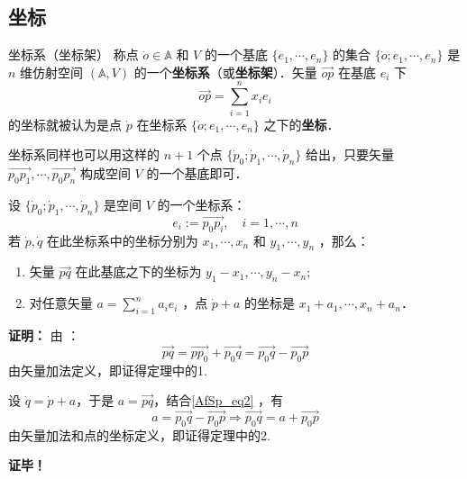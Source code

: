 \subsection{坐标}
\begin{definition}{坐标系（坐标架）}
称点 $\dot o\in\mathbb A$ 和 $V$ 的一个基底 $\{e_1,\cdots,e_n\}$ 的集合 $\{\dot o;e_1,\cdots,e_n\}$ 是 $n$ 维仿射空间 $(\mathbb A,V)$ 的一个\textbf{坐标系}（或\textbf{坐标架}）．矢量 $\overrightarrow{op}$ 在基底 ${e_i}$ 下
\begin{equation}
\overrightarrow{op}=\sum_{i=1}^n x_ie_i
\end{equation}
的坐标就被认为是点 $\dot p$ 在坐标系 $\{\dot o;e_1,\cdots,e_n\}$ 之下的\textbf{坐标}．
\end{definition}
坐标系同样也可以用这样的 $n+1$ 个点 $\{\dot p_0;\dot p_1,\cdots,\dot p_n\}$ 给出，只要矢量 $\overrightarrow{p_0p_1},\cdots,\overrightarrow{p_0p_n}$ 构成空间 $V$ 的一个基底即可．
\begin{theorem}{}\label{AfSp_the2}
设 $\{\dot p_0;\dot p_1,\cdots,\dot p_n\}$ 是空间 $V$ 的一个坐标系：
\begin{equation}
e_i:=\overrightarrow{p_0 p_i},\quad i=1,\cdots,n
\end{equation}
若 $\dot p,\dot q$ 在此坐标系中的坐标分别为 $x_1,\cdots,x_n$ 和 $y_1,\cdots,y_n$ ，那么：
\begin{enumerate}
\item 矢量 $\overrightarrow{pq}$ 在此基底之下的坐标为 $y_1-x_1,\cdots,y_n-x_n$;
\item 对任意矢量 $a=\sum\limits_{i=1}^n a_ie_i$ ，点 $\dot p+a$ 的坐标是 $x_1+a_1,\cdots,x_n+a_n$．
\end{enumerate}
\end{theorem} 
\textbf{证明：} 由 ：
\begin{equation}\label{AfSp_eq2}
\overrightarrow{pq}=\overrightarrow{pp_0}+\overrightarrow{p_0q}=\overrightarrow{p_0q}-\overrightarrow{p_0p}
\end{equation}
由矢量加法定义，即证得定理中的1.

设 $\dot q=\dot p+a$，于是 $a=\overrightarrow{pq}$，结合\autoref{AfSp_eq2} ，有
\begin{equation}
a=\overrightarrow{p_0q}-\overrightarrow{p_0p}\Rightarrow \overrightarrow{p_0q}=a+\overrightarrow{p_0p}
\end{equation}
由矢量加法和点的坐标定义，即证得定理中的2.

\textbf{证毕！}
